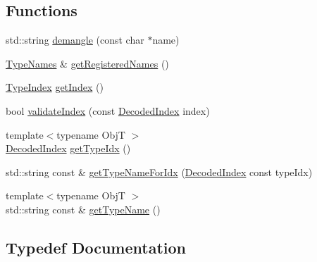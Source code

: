\subsection*{Functions}
\begin{DoxyCompactItemize}
\item 
std\+::string \hyperlink{namespacecheckpoint_1_1dispatch_1_1typeregistry_aa2dadf5c548fb89df1ac165e46e3abb1}{demangle} (const char $\ast$name)
\item 
\hyperlink{namespacecheckpoint_1_1dispatch_1_1typeregistry_ae6cc6f19ecb8f66f73fa14a1acdc9b6e}{Type\+Names} \& \hyperlink{namespacecheckpoint_1_1dispatch_1_1typeregistry_a776129162f67bbb5d2faf699e408074b}{get\+Registered\+Names} ()
\item 
\hyperlink{namespacecheckpoint_1_1dispatch_1_1typeregistry_a40b8b0de7b59181c6b3d8f2657280467}{Type\+Index} \hyperlink{namespacecheckpoint_1_1dispatch_1_1typeregistry_aa75ef84e9b63a687784360ded2d56fe4}{get\+Index} ()
\item 
bool \hyperlink{namespacecheckpoint_1_1dispatch_1_1typeregistry_ad6c54e529f67d0cb0aca100f1595d002}{validate\+Index} (const \hyperlink{namespacecheckpoint_1_1dispatch_1_1typeregistry_a3d1f57de0a997a245eb9e1db07b94140}{Decoded\+Index} index)
\item 
{\footnotesize template$<$typename ObjT $>$ }\\\hyperlink{namespacecheckpoint_1_1dispatch_1_1typeregistry_a3d1f57de0a997a245eb9e1db07b94140}{Decoded\+Index} \hyperlink{namespacecheckpoint_1_1dispatch_1_1typeregistry_aa6368a47718fd3d3b14939d5527a784e}{get\+Type\+Idx} ()
\item 
std\+::string const  \& \hyperlink{namespacecheckpoint_1_1dispatch_1_1typeregistry_a21d113cb606378f33d1197c34ec7b123}{get\+Type\+Name\+For\+Idx} (\hyperlink{namespacecheckpoint_1_1dispatch_1_1typeregistry_a3d1f57de0a997a245eb9e1db07b94140}{Decoded\+Index} const type\+Idx)
\item 
{\footnotesize template$<$typename ObjT $>$ }\\std\+::string const  \& \hyperlink{namespacecheckpoint_1_1dispatch_1_1typeregistry_a54bb3fe99003e84c326146956076df18}{get\+Type\+Name} ()
\end{DoxyCompactItemize}


\subsection{Typedef Documentation}
\mbox{\label{namespacecheckpoint_1_1dispatch_1_1typeregistry_ad37ee8c21a6bdfc7b6826843631af922}} 
